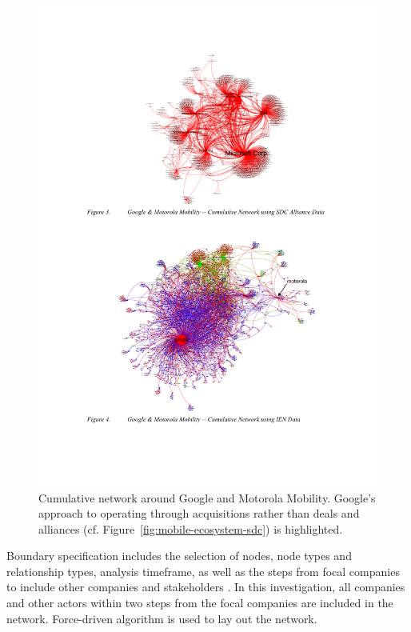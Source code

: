 \begin{figure}[htb]
\centering
\includegraphics[]{figure/Mobile-Ecosystem-Google-Motorola-IEND.pdf}
\caption{Cumulative network around Google and Motorola Mobility. Google's approach to operating through acquisitions rather than deals and alliances (cf. Figure~\ref{fig:mobile-ecosystem-sdc}) is highlighted. \citep{Basole2012UnderstandingApproach}}
\label{fig:mobile-ecosystem-iend}
\end{figure}

Boundary specification includes the selection of nodes, node types and relationship types, analysis timeframe, as well as the steps from focal companies to include other companies and stakeholders \citep{Basole2012UnderstandingApproach}. In this investigation, all companies and other actors within two steps from the focal companies are included in the network. Force-driven algorithm is used to lay out the network.

